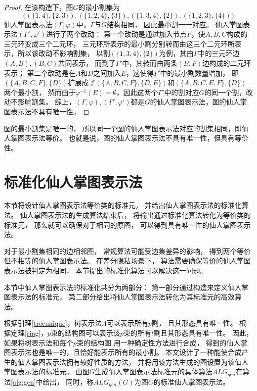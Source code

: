 \begin{proof}
在该构造下，图$G$的最小割集为
\begin{equation}
\{(\{1,4\},\{2,3\}),(\{1,2,4\},\{3\}),(\{1,3,4\},\{2\}),(\{1,2,3\},\{4\})\}
\end{equation}
仙人掌图表示法$(\Gamma,\varphi)$中，$\Gamma$与$G$结构相同，
因此最小割一一对应。
仙人掌图表示法$(\Gamma',\varphi')$进行了两个改动：
第一个改动是通过加入节点$F$，使$A,B,C$构成的三元环变成三个二元环，
三元环所表示的最小割分别转而由这三个二元环所表示，所以该改动不影响割集，
以割$(\{1,3,4\},\{2\})$为例，其由$\Gamma$中的三元环边$(A,B),(B,C)$共同表示，
而到了$\Gamma'$中，其转而由两条$(B,F)$边构成的二元环表示；
第二个改动是在$A$和$D$之间加入$E$，这使得$\Gamma'$中的最小割数量增加，
即$(\{A,B,C,F\},\{D\})$扩展成了$(\{A,B,C,F\},\{D,E\})$和$(\{A,B,C,E,F\},\{D\})$两个最小割，
然而由于$\varphi^{-1}(E)=\emptyset$，因此这两个$\Gamma'$中的割对应$G$的同一个割，改动不影响割集。
综上，$(\Gamma,\varphi),(\Gamma',\varphi')$都是$G$的仙人掌图表示法，图的仙人掌图表示法不具有唯一性。
\end{proof}

图的最小割集是唯一的，
所以同一个图的仙人掌图表示法对应的割集相同，即仙人掌图表示法等价。
也就是说，图的仙人掌图表示法不具有唯一性，但具有等价性。

\section{标准化仙人掌图表示法}

本节将设计仙人掌图表示法等价类的标准元，
并给出仙人掌图表示法的标准化算法。
仙人掌图表示法的生成算法结束后，
将输出通过标准化算法转化为等价类的标准元，
那么就可以确保对于相同的原图，
可以得到具有唯一性的仙人掌图表示法。

对于最小割集相同的边相邻图，
常规算法可能受边集差异的影响，
得到两个等价但不相等的仙人掌图表示法。
在差分隐私场景下，
算法需要确保等价的仙人掌图表示法被判定为相同，
本节提出的标准化算法可以解决这一问题。

本节中仙人掌图表示法的标准化共分为两部分：
第一部分通过构造来定义仙人掌图表示法的标准元，
第二部分给出将仙人掌图表示法转化为其标准元的高效算法。

根据引理\ref{treeunique}，树表示法$\Lambda$可以表示所有$p$割，
且其形态具有唯一性。
根据定理\ref{ring}，$p$束的结构图可以表示该$p$束的所有$t$割且其形态具有唯一性。
因此，如果将树表示法和每个$p$束的结构图
用一种确定性方法进行合成，
得到的仙人掌图表示法也是唯一的，且恰好能表示所有的最小割。
本文设计了一种能使合成产生的仙人掌图表示法拥有较好性质的方法，
并将用该方法生成的图设置为该仙人掌图表示法的标准元。
由图$G$生成仙人掌图表示法标准元的具体算法$ALG_{gen}$在算法\ref{alg:gen}中给出，
同时，称$ALG_{gen}(G)$为图$G$的标准仙人掌图表示法。

